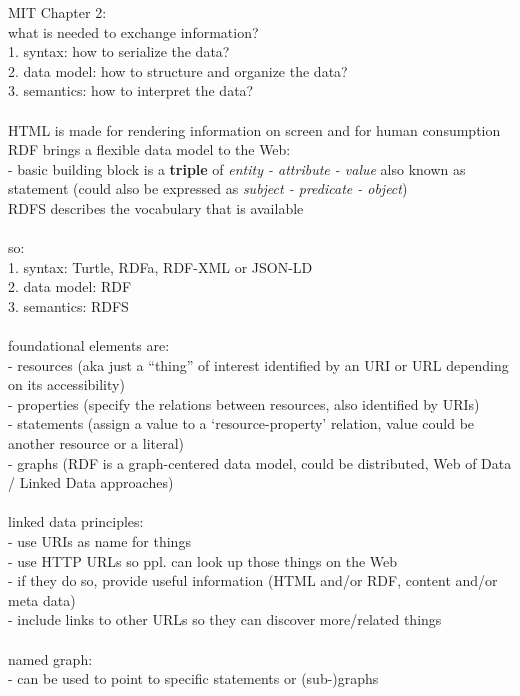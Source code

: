 MIT Chapter 2: \\
what is needed to exchange information? \\
1. syntax: how to serialize the data? \\
2. data model: how to structure and organize the data? \\
3. semantics: how to interpret the data? \\
\\
HTML is made for rendering information on screen and for human consumption \\
RDF brings a flexible data model to the Web: \\
- basic building block is a \textbf{triple} of \textit{entity - attribute - value}
also known as statement (could also be expressed as \textit{subject - predicate - object}) \\
RDFS describes the vocabulary that is available \\
\\
so: \\
1. syntax: Turtle, RDFa, RDF-XML or JSON-LD \\
2. data model: RDF \\
3. semantics: RDFS \\
\\
foundational elements are: \\
- resources (aka just a ``thing'' of interest identified by an URI or URL depending on its accessibility) \\
- properties (specify the relations between resources, also identified by URIs) \\
- statements (assign a value to a `resource-property' relation, value could be another resource or a literal) \\
- graphs (RDF is a graph-centered data model, could be distributed, Web of Data / Linked Data approaches) \\
\\
linked data principles: \\
- use URIs as name for things \\
- use HTTP URLs so ppl. can look up those things on the Web \\
- if they do so, provide useful information (HTML and/or RDF, content and/or meta data) \\
- include links to other URLs so they can discover more/related things \\
\\
named graph: \\
- can be used to point to specific statements or (sub-)graphs \\
